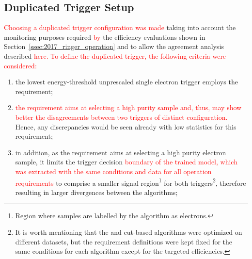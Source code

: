 \subsection{Duplicated Trigger Setup}\label{top:duplicated}

\textcolor{red}{Choosing a duplicated trigger configuration was made} 
taking into account the
monitoring purposes required \textcolor{red}{by} the efficiency evaluations shown in
Section~\ref{ssec:2017_ringer_operation} and to allow the agreement analysis described \textcolor{red}{here. To define the duplicated trigger, the following criteria were considered:}


\begin{enumerate}
  \item the lowest energy-threshold unprescaled single electron trigger employs the \tight requirement;%
  \item \textcolor{red}{the \tight requirement aims at selecting a high purity sample and, thus, may show better the disagreements between two triggers of distinct configuration. }Hence, any discrepancies would be seen already with low statistics for this requirement;%
  \item in addition, as the \tight requirement aims at selecting a high purity electron sample, it limits the trigger decision 
  \textcolor{red}{boundary of the trained model, which was extracted with the same conditions and data for all operation requirements} 
  to comprise a smaller signal region\footnote{Region where samples are labelled by the algorithm as electrons.} for both triggers\footnote{It is worth mentioning that the \rnn{} and cut-based algorithms were optimized on different datasets, but the requirement definitions were kept fixed for the same conditions for each algorithm except for the targeted efficiencies.}, therefore resulting in larger divergences between the algorithms;
  

\end{enumerate}
